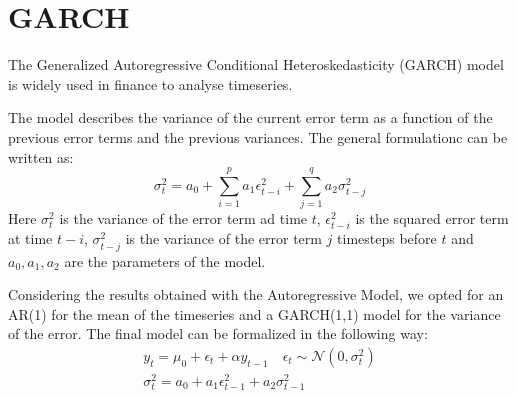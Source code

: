 \section{GARCH}
\label{sec:GARCH}
The Generalized Autoregressive Conditional Heteroskedasticity (GARCH) model is widely used in finance to analyse timeseries.

The model describes the variance of the current error term as a function of the previous error terms and the previous variances. The general formulationc can be written as:
\begin{equation}
    \sigma^2_t = a_{0} + \sum^{p}_{i=1}a_1 \epsilon^2_{t-i} + \sum^{q}_{j=1}a_2 \sigma^2_{t-j}
\end{equation}
Here $\sigma^2_t$ is the variance of the error term ad time $t$, $\epsilon^2_{t-i}$ is the squared error term at time $t-i$, $\sigma^2_{t-j}$ is the variance of the error term $j$ timesteps before $t$ and $a_0, a_1, a_2$ are the parameters of the model.

Considering the results obtained with the Autoregressive Model, we opted for an AR(1) for the mean of the timeseries and a GARCH(1,1) model for the variance of the error. The final model can be formalized in the following way:
\begin{equation}
    \begin{split}
        y_{t} = \mu_{0} + \epsilon_t + \alpha y_{t-1} \quad \epsilon_t \sim \mathcal{N}(0, \sigma^2_t) \\
        \sigma^2_t = a_{0} + a_1 \epsilon^2_{t-1} + a_2 \sigma^2_{t-1}
    \end{split}
\end{equation}

